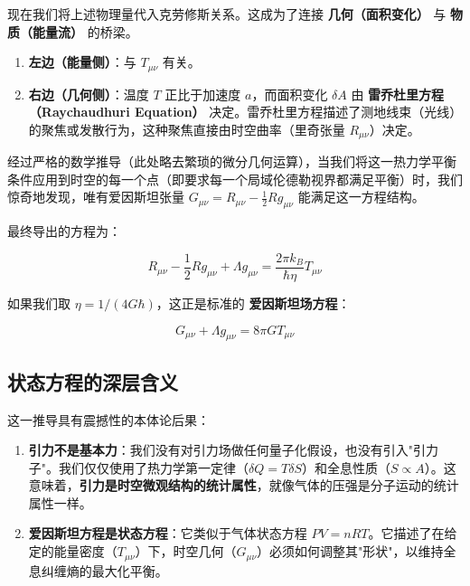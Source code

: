 现在我们将上述物理量代入克劳修斯关系。这成为了连接 \textbf{几何（面积变化）} 与 \textbf{物质（能量流）} 的桥梁。

\begin{enumerate}
\item \textbf{左边（能量侧）}：与 $T_{\mu\nu}$ 有关。

\item \textbf{右边（几何侧）}：温度 $T$ 正比于加速度 $a$，而面积变化 $\delta A$ 由 \textbf{雷乔杜里方程（Raychaudhuri Equation）} 决定。雷乔杜里方程描述了测地线束（光线）的聚焦或发散行为，这种聚焦直接由时空曲率（里奇张量 $R_{\mu\nu}$）决定。
\end{enumerate}

经过严格的数学推导（此处略去繁琐的微分几何运算），当我们将这一热力学平衡条件应用到时空的每一个点（即要求每一个局域伦德勒视界都满足平衡）时，我们惊奇地发现，唯有爱因斯坦张量 $G_{\mu\nu} = R_{\mu\nu} - \frac{1}{2}Rg_{\mu\nu}$ 能满足这一方程结构。

最终导出的方程为：

\begin{equation}
R_{\mu\nu} - \frac{1}{2}Rg_{\mu\nu} + \Lambda g_{\mu\nu} = \frac{2\pi k_B}{\hbar \eta} T_{\mu\nu}
\end{equation}

如果我们取 $\eta = 1/(4G\hbar)$，这正是标准的 \textbf{爱因斯坦场方程}：

\begin{equation}
G_{\mu\nu} + \Lambda g_{\mu\nu} = 8\pi G T_{\mu\nu}
\end{equation}

\subsection{状态方程的深层含义}

这一推导具有震撼性的本体论后果：

\begin{enumerate}
\item \textbf{引力不是基本力}：我们没有对引力场做任何量子化假设，也没有引入"引力子"。我们仅仅使用了热力学第一定律（$\delta Q = T \delta S$）和全息性质（$S \propto A$）。这意味着，\textbf{引力是时空微观结构的统计属性}，就像气体的压强是分子运动的统计属性一样。

\item \textbf{爱因斯坦方程是状态方程}：它类似于气体状态方程 $PV = nRT$。它描述了在给定的能量密度（$T_{\mu\nu}$）下，时空几何（$G_{\mu\nu}$）必须如何调整其"形状"，以维持全息纠缠熵的最大化平衡。
\end{enumerate}

